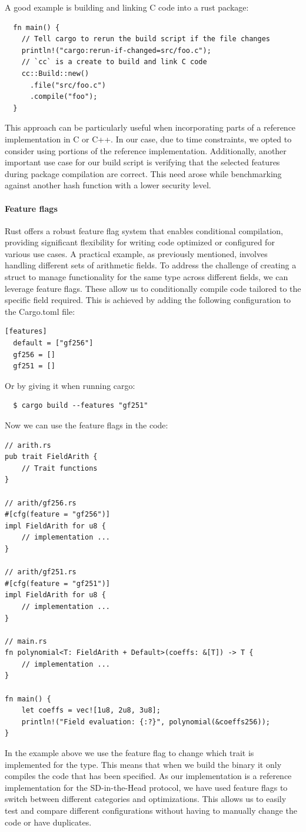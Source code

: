 \documentclass[11pt]{report}
\theoremstyle{definition}
\theoremstyle{plain}
\begin{document}
A good example is building and linking C code into a rust package:
\begin{verbatim}
  fn main() {
    // Tell cargo to rerun the build script if the file changes
    println!("cargo:rerun-if-changed=src/foo.c");
    // `cc` is a create to build and link C code
    cc::Build::new()
      .file("src/foo.c")
      .compile("foo");
  }
\end{verbatim}
This approach can be particularly useful when incorporating parts of a reference implementation in C or C++. In our case, due to time constraints, we opted to consider using portions of the reference implementation. Additionally, another important use case for our build script is verifying that the selected features during package compilation are correct. This need arose while benchmarking against another hash function with a lower security level.

\paragraph{Feature flags}
Rust offers a robust feature flag system that enables conditional compilation, providing significant flexibility for writing code optimized or configured for various use cases.
A practical example, as previously mentioned, involves handling different sets of arithmetic fields. To address the challenge of creating a struct to manage functionality for the same type across different fields, we can leverage feature flags. These allow us to conditionally compile code tailored to the specific field required. This is achieved by adding the following configuration to the Cargo.toml file:
\begin{verbatim}
[features]
  default = ["gf256"]
  gf256 = []
  gf251 = []
\end{verbatim}
Or by giving it when running cargo:
\begin{verbatim}
  $ cargo build --features "gf251"
\end{verbatim}
Now we can use the feature flags in the code:
\begin{verbatim}
// arith.rs
pub trait FieldArith {
    // Trait functions
}

// arith/gf256.rs
#[cfg(feature = "gf256")]
impl FieldArith for u8 {
    // implementation ...
}

// arith/gf251.rs
#[cfg(feature = "gf251")]
impl FieldArith for u8 {
    // implementation ...
}

// main.rs
fn polynomial<T: FieldArith + Default>(coeffs: &[T]) -> T {
    // implementation ...
}

fn main() {
    let coeffs = vec![1u8, 2u8, 3u8];
    println!("Field evaluation: {:?}", polynomial(&coeffs256));
}
\end{verbatim}
In the example above we use the feature flag to change which trait is implemented for the  type. This means that when we build the binary it only compiles the code that has been specified.
As our implementation is a reference implementation for the SD-in-the-Head protocol, we have used feature flags to switch between different categories and optimizations. This allows us to easily test and compare different configurations without having to manually change the code or have duplicates.
\end{document}
